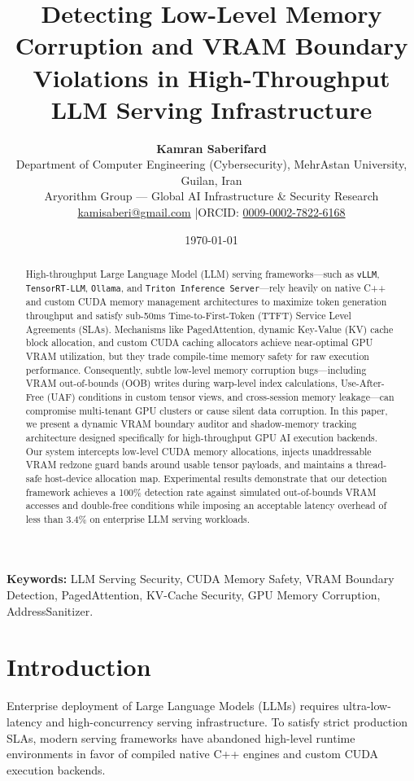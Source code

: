 \documentclass[11pt,a4paper]{article}
\title{\Large\bfseries Detecting Low-Level Memory Corruption and VRAM Boundary Violations in High-Throughput LLM Serving Infrastructure}
\author{
    \textbf{Kamran Saberifard}\\[4pt]
    Department of Computer Engineering (Cybersecurity), MehrAstan University, Guilan, Iran\\
    Aryorithm Group — Global AI Infrastructure \& Security Research\\
    \href{mailto:kamisaberi@gmail.com}{kamisaberi@gmail.com} \quad|\quad ORCID: \href{https://orcid.org/0009-0002-7822-6168}{0009-0002-7822-6168}
}
\date{\today}
\begin{document}
\maketitle

\begin{abstract}
\noindent High-throughput Large Language Model (LLM) serving frameworks—such as \texttt{vLLM}, \texttt{TensorRT-LLM}, \texttt{Ollama}, and \texttt{Triton Inference Server}—rely heavily on native C++ and custom CUDA memory management architectures to maximize token generation throughput and satisfy sub-50ms Time-to-First-Token (TTFT) Service Level Agreements (SLAs). Mechanisms like PagedAttention, dynamic Key-Value (KV) cache block allocation, and custom CUDA caching allocators achieve near-optimal GPU VRAM utilization, but they trade compile-time memory safety for raw execution performance. Consequently, subtle low-level memory corruption bugs—including VRAM out-of-bounds (OOB) writes during warp-level index calculations, Use-After-Free (UAF) conditions in custom tensor views, and cross-session memory leakage—can compromise multi-tenant GPU clusters or cause silent data corruption. In this paper, we present a dynamic VRAM boundary auditor and shadow-memory tracking architecture designed specifically for high-throughput GPU AI execution backends. Our system intercepts low-level CUDA memory allocations, injects unaddressable VRAM redzone guard bands around usable tensor payloads, and maintains a thread-safe host-device allocation map. Experimental results demonstrate that our detection framework achieves a 100\% detection rate against simulated out-of-bounds VRAM accesses and double-free conditions while imposing an acceptable latency overhead of less than 3.4\% on enterprise LLM serving workloads.
\end{abstract}

\vspace{6pt}
\noindent\textbf{Keywords:} LLM Serving Security, CUDA Memory Safety, VRAM Boundary Detection, PagedAttention, KV-Cache Security, GPU Memory Corruption, AddressSanitizer.

\hr

\section{Introduction}
Enterprise deployment of Large Language Models (LLMs) requires ultra-low-latency and high-concurrency serving infrastructure. To satisfy strict production SLAs, modern serving frameworks have abandoned high-level runtime environments in favor of compiled native C++ engines and custom CUDA execution backends.
\end{document}
